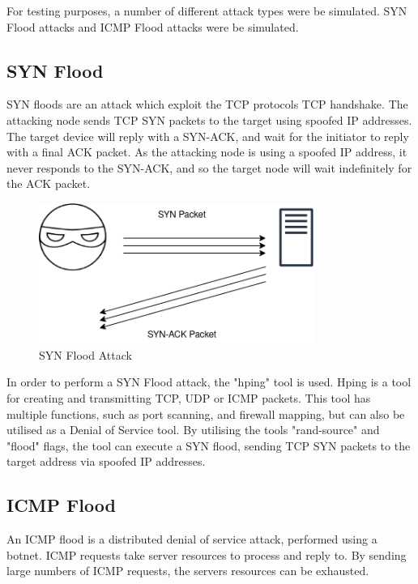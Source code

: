 For testing purposes, a number of different attack types were be simulated. SYN
Flood attacks and ICMP Flood attacks were be simulated.

\subsection{SYN Flood}

SYN floods are an attack which exploit the TCP protocols TCP handshake. The
attacking node sends TCP SYN packets to the target using spoofed IP addresses.
The target device will reply with a SYN-ACK, and wait for the initiator to reply
with a final ACK packet. As the attacking node is using a spoofed IP address, it
never responds to the SYN-ACK, and so the target node will wait indefinitely for
the ACK packet\cite{cfSynFlood}.

\begin{figure}[H]
	\centering
	\includegraphics[width=0.8\textwidth]{images/SYNAttack}
	\caption{SYN Flood Attack}
	\label{fig:images-SYNAttack}
\end{figure}

In order to perform a SYN Flood attack, the "hping" tool is used. Hping is a
tool for creating and transmitting TCP, UDP or ICMP packets. This tool has
multiple functions, such as port scanning, and firewall mapping, but can also be
utilised as a Denial of Service tool. By utilising the tools "rand-source" and
"flood" flags, the tool can execute a SYN flood, sending TCP SYN packets to the
target address via spoofed IP addresses.

\subsection{ICMP Flood}

An ICMP flood is a distributed denial of service attack, performed using a
botnet\cite{cfIcmpFlood}. ICMP requests take server resources to process and reply to. By sending
large numbers of ICMP requests, the servers resources can be exhausted.

